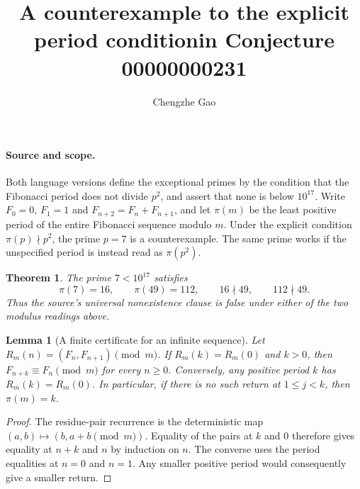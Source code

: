 \documentclass[11pt]{article}
\newtheorem{theorem}{Theorem}
\newtheorem{lemma}{Lemma}
\begin{document}
\title{A counterexample to the explicit period condition\newline in Conjecture 00000000231}
\author{Chengzhe Gao}\date{}\maketitle

\paragraph{Source and scope.}
Both language versions define the exceptional primes by the condition
that the Fibonacci period does not divide $p^2$, and assert that none
is below $10^{17}$. Write $F_0=0$, $F_1=1$ and
$F_{n+2}=F_n+F_{n+1}$, and let $\pi(m)$ be the least positive period
of the entire Fibonacci sequence modulo $m$.
Under the explicit condition $\pi(p)\nmid p^2$, the prime $p=7$
is a counterexample. The same prime works if the unspecified period
is instead read as $\pi(p^2)$.

\begin{theorem}
The prime $7<10^{17}$ satisfies
\[
 \pi(7)=16,\qquad \pi(49)=112,\qquad
 16\nmid49,\qquad112\nmid49.
\]
Thus the source's universal nonexistence clause is false under either
of the two modulus readings above.
\end{theorem}

\begin{lemma}[A finite certificate for an infinite sequence]
Let $R_m(n)=(F_n,F_{n+1})\pmod m$. If $R_m(k)=R_m(0)$ and $k>0$,
then $F_{n+k}\equiv F_n\pmod m$ for every $n\geq0$.
Conversely, any positive period $k$ has $R_m(k)=R_m(0)$.
In particular, if there is no such return at $1\leq j<k$, then
$\pi(m)=k$.
\end{lemma}
\begin{proof}
The residue-pair recurrence is the deterministic map
$(a,b)\mapsto (b,a+b\pmod m)$. Equality of the pairs at $k$ and $0$
therefore gives equality at $n+k$ and $n$ by induction on $n$.
The converse uses the period equalities at $n=0$ and $n=1$.
Any smaller positive period would consequently give a smaller return.
\end{proof}
\end{document}

